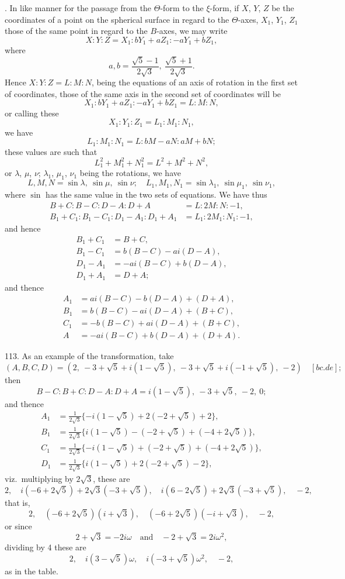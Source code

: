 \documentclass[11pt,a4paper]{book}
\begin{document}
. In like manner for the passage from the $\Theta$-form to the $\xi$-form, if $X$, $Y$, $Z$ be the coordinates of a point on the spherical surface in regard to the $\Theta$-axes, $X_1$, $Y_1$, $Z_1$ those of the same point in regard to the $B$-axes, we may write
\[
X : Y : Z = X_1 : bY_1 + aZ_1 : -aY_1 + bZ_1,
\]
where
\[
a, b = \frac{\sqrt{5}-1}{2\sqrt{3}},\ \frac{\sqrt{5}+1}{2\sqrt{3}}.
\]
Hence $X : Y : Z = L : M : N$, being the equations of an axis of rotation in the first set of coordinates, those of the same axis in the second set of coordinates will be
\[
X_1 : bY_1 + aZ_1 : -aY_1 + bZ_1 = L : M : N,
\]
or calling these
\[
X_1 : Y_1 : Z_1 = L_1 : M_1 : N_1,
\]
we have
\[
L_1 : M_1 : N_1 = L : bM - aN : aM + bN;
\]
these values are such that
\[
L_1^2 + M_1^2 + N_1^2 = L^2 + M^2 + N^2,
\]
or $\lambda$, $\mu$, $\nu$; $\lambda_1$, $\mu_1$, $\nu_1$ being the rotations, we have
\[
L, M, N = \sin\lambda,\ \sin\mu,\ \sin\nu;\quad L_1, M_1, N_1 = \sin\lambda_1,\ \sin\mu_1,\ \sin\nu_1,
\]
where $\sin$ has the same value in the two sets of equations. We have thus
\begin{align*}
B+C : B-C : D-A : D+A &= L : 2M : N : -1, \\
B_1+C_1 : B_1-C_1 : D_1-A_1 : D_1+A_1 &= L_1 : 2M_1 : N_1 : -1,
\end{align*}
and hence
\begin{align*}
B_1 + C_1 &= B + C, \\
B_1 - C_1 &= b(B-C) - ai(D-A), \\
D_1 - A_1 &= -ai(B-C) + b(D-A), \\
D_1 + A_1 &= D + A;
\end{align*}
and thence
\begin{align*}
A_1 &= ai(B-C) - b(D-A) + (D+A), \\
B_1 &= b(B-C) - ai(D-A) + (B+C), \\
C_1 &= -b(B-C) + ai(D-A) + (B+C), \\
A &= -ai(B-C) + b(D-A) + (D+A).
\end{align*}

113. As an example of the transformation, take
\[
(A, B, C, D) = (2,\ -3+\sqrt{5}+i(1-\sqrt{5}),\ -3+\sqrt{5}+i(-1+\sqrt{5}),\ -2)\quad [bc.de];
\]
then
\[
B-C : B+C : D-A : D+A = i(1-\sqrt{5}),\ -3+\sqrt{5},\ -2,\ 0;
\]
\newpage
\noindent and thence
\begin{align*}
A_1 &= \frac{1}{2\sqrt{3}}\{-i(1-\sqrt{5}) + 2(-2+\sqrt{5}) + 2\}, \\
B_1 &= \frac{1}{2\sqrt{3}}\{i(1-\sqrt{5}) - (-2+\sqrt{5}) + (-4+2\sqrt{5})\}, \\
C_1 &= \frac{1}{2\sqrt{3}}\{-i(1-\sqrt{5}) + (-2+\sqrt{5}) + (-4+2\sqrt{5})\}, \\
D_1 &= \frac{1}{2\sqrt{3}}\{i(1-\sqrt{5}) + 2(-2+\sqrt{5}) - 2\},
\end{align*}
viz.~multiplying by $2\sqrt{3}$, these are
\[
2,\quad i(-6+2\sqrt{5}) + 2\sqrt{3}(-3+\sqrt{5}),\quad i(6-2\sqrt{5}) + 2\sqrt{3}(-3+\sqrt{5}),\quad -2,
\]
that is,
\[
2,\quad (-6+2\sqrt{5})(i+\sqrt{3}),\quad (-6+2\sqrt{5})(-i+\sqrt{3}),\quad -2,
\]
or since
\[
2 + \sqrt{3} = -2i\omega \quad \text{and} \quad -2 + \sqrt{3} = 2i\omega^2,
\]
dividing by 4 these are
\[
2,\quad i(3-\sqrt{5})\omega,\quad i(-3+\sqrt{5})\omega^2,\quad -2,
\]
as in the table.
\end{document}
